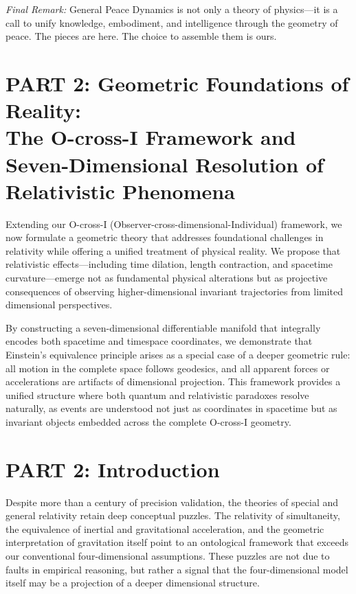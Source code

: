 \documentclass{article}
\begin{document}
\textit{Final Remark:} General Peace Dynamics is not only a theory of physics—it is a call to unify knowledge, embodiment, and intelligence through the geometry of peace. The pieces are here. The choice to assemble them is ours.






\section{PART 2: Geometric Foundations of Reality: \\ The O-cross-I Framework and Seven-Dimensional Resolution of Relativistic Phenomena}

Extending our O-cross-I (Observer-cross-dimensional-Individual) framework, we now formulate a geometric theory that addresses foundational challenges in relativity while offering a unified treatment of physical reality. We propose that relativistic effects---including time dilation, length contraction, and spacetime curvature---emerge not as fundamental physical alterations but as projective consequences of observing higher-dimensional invariant trajectories from limited dimensional perspectives. 

By constructing a seven-dimensional differentiable manifold that integrally encodes both spacetime and timespace coordinates, we demonstrate that Einstein's equivalence principle arises as a special case of a deeper geometric rule: all motion in the complete space follows geodesics, and all apparent forces or accelerations are artifacts of dimensional projection. This framework provides a unified structure where both quantum and relativistic paradoxes resolve naturally, as events are understood not just as coordinates in spacetime but as invariant objects embedded across the complete O-cross-I geometry.

\section{PART 2: Introduction}

Despite more than a century of precision validation, the theories of special and general relativity retain deep conceptual puzzles. The relativity of simultaneity, the equivalence of inertial and gravitational acceleration, and the geometric interpretation of gravitation itself point to an ontological framework that exceeds our conventional four-dimensional assumptions. These puzzles are not due to faults in empirical reasoning, but rather a signal that the four-dimensional model itself may be a projection of a deeper dimensional structure.
\end{document}
